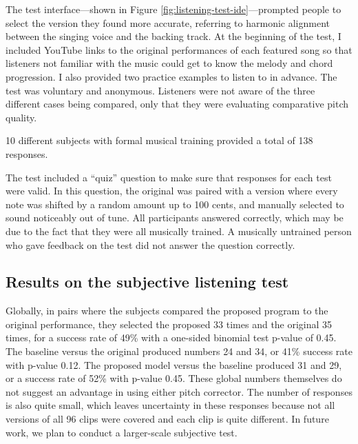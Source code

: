 The test interface---shown in Figure \ref{fig:listening-test-ide}---prompted people to select the version they found more accurate, referring to harmonic alignment between the singing voice and the backing track. At the beginning of the test, I included YouTube links to the original performances of each featured song so that listeners not familiar with the music could get to know the melody and chord progression. I also provided two practice examples to listen to in advance. The test was voluntary and anonymous. Listeners were not aware of the three different cases being compared, only that they were evaluating comparative pitch quality. 

10 different subjects with formal musical training provided a total of 138 responses. 

The test included a ``quiz'' question to make sure that responses for each test were valid. In this question, the original was paired with a version where every note was shifted by a random amount up to 100 cents, and manually selected to sound noticeably out of tune. All participants answered correctly, which may be due to the fact that they were all musically trained. A musically untrained person who gave feedback on the test did not answer the question correctly.

\subsection{Results on the subjective listening test}
\label{sec:subjective-results}
Globally, in pairs where the subjects compared the proposed program to the original performance, they selected the proposed 33 times and the original 35 times, for a success rate of 49\% with a one-sided binomial test p-value of 0.45. The baseline versus the original produced numbers 24 and 34, or 41\% success rate with p-value 0.12. The proposed model versus the baseline produced 31 and 29, or a success rate of 52\% with p-value 0.45. These global numbers themselves do not suggest an advantage in using either pitch corrector. The number of responses is also quite small, which leaves uncertainty in these responses because not all versions of all 96 clips were covered and each clip is quite different. In future work, we plan to conduct a larger-scale subjective test.

